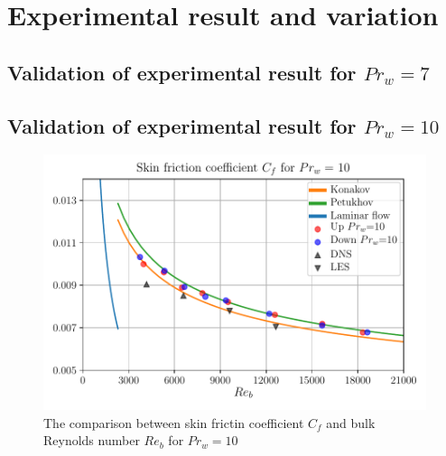\documentclass[12pt,oneside]{jbook}
\begin{document}
\section{Experimental result and variation}
\subsection{Validation of experimental result for $Pr_{w}=7$}
\subsection{Validation of experimental result for $Pr_{w}=10$}


\begin{figure}[ht]
	\vspace{0zh}
	\begin{center}
		\includegraphics[width=0.9\linewidth]{fig/pr10_recf.pdf}
		\vspace{-1zh}
		\caption{The comparison between skin frictin coefficient $C_{f}$ and bulk Reynolds number $Re_{b}$ for $Pr_{w} = 10$}
		\label{pr}
	\end{center}
	\vspace{0zh}
\end{figure}
\end{document}

